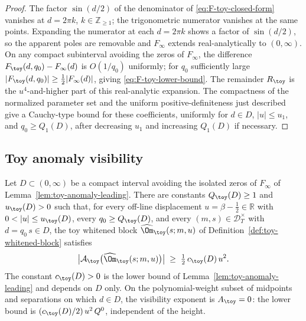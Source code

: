 \begin{proof}
The factor \(\sin(d/2)\) of the denominator of
\eqref{eq:F-toy-closed-form} vanishes at \(d=2\pi k\),
\(k\in\mathbb Z_{\ge 1}\); the trigonometric numerator vanishes at
the same points.  Expanding the numerator at each \(d=2\pi k\) shows a
factor of \(\sin(d/2)\), so the apparent poles are removable and
\(F_{\infty}\) extends real-analytically to \((0,\infty)\).  On any compact subinterval avoiding the zeros of
\(F_{\infty}\), the difference \(F_\toy(d,q_0)-F_{\infty}(d)\) is
\(O(1/q_0)\) uniformly; for \(q_0\) sufficiently large
\(|F_\toy(d,q_0)|\ge \tfrac12|F_{\infty}(d)|\), giving
\eqref{eq:F-toy-lower-bound}.  The remainder \(R_\toy\) is the \(u^4\)-and-higher part of this
real-analytic expansion.  The compactness of the normalized parameter
set and the uniform positive-definiteness just described give a
Cauchy-type bound for these coefficients, uniformly for \(d\in D\),
\(|u|\le u_1\), and \(q_0\ge Q_1(D)\), after decreasing \(u_1\) and
increasing \(Q_1(D)\) if necessary.
\end{proof}

\subsection{Toy anomaly visibility}
\label{subsec:toy-anomaly-visibility}

\begin{theorem}
\label{thm:toy-anomaly-visibility}
Let \(D\subset(0,\infty)\) be a compact interval avoiding the
isolated zeros of \(F_{\infty}\) of
Lemma~\ref{lem:toy-anomaly-leading}.  There are constants
\(Q_\toy(D)\ge1\) and \(u_\toy(D)>0\) such that, for every off-line
displacement \(u=\beta-\tfrac12\in\mathbb R\) with \(0<|u|\le u_\toy(D)\),
every \(q_0\ge Q_\toy(D)\), and every \((m,s)\in\mathcal D_T^\times\)
with \(d=q_0\,s\in D\), the toy
whitened block \(\widehat\Om_\toy(s;m,u)\) of
Definition~\ref{def:toy-whitened-block} satisfies
\begin{equation}
\label{eq:toy-anomaly-visibility-A}
        \bigl|\mathcal A_\toy\bigl(\widehat\Om_\toy(s;m,u)\bigr)\bigr|
        \;\ge\;
        \tfrac12\,c_\toy(D)\,u^2.
\end{equation}
The constant \(c_\toy(D)>0\) is the lower bound of
Lemma~\ref{lem:toy-anomaly-leading} and depends on \(D\) only.
On the polynomial-weight subset of midpoints and separations on which
\(d\in D\), the visibility exponent is \(A_\toy=0\): the lower bound
is \((c_\toy(D)/2)\,u^2\,Q^0\), independent of the height.
\end{theorem}

